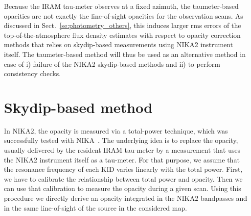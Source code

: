 %
%


Because the IRAM tau-meter observes at a fixed azimuth, the
taumeter-based opacities are not exactly the line-of-sight opacities for
the observation scans. As discussed in
Sect.~\ref{se:photometry_others}, this induces larger rms errors of
the top-of-the-atmosphere flux density estimates with respect to
opacity correction methods that relies on skydip-based measurements using
NIKA2 instrument itself. The taumeter-based method will thus be used
as an alternative method in case of i) failure of the NIKA2 skydip-based
methods and ii) to perform consistency checks.




\section{Skydip-based method}%
\label{se:skydip-method}

In NIKA2, the opacity is measured via a total-power technique, which was
successfully tested with NIKA~\cite{Catalano:2014nml}.  The
underlying idea is to replace the opacity, usually delivered by the resident
IRAM tau-meter by a measurement that uses the NIKA2 instrument itself
as a tau-meter. For that purpose, we assume that the resonance
frequency of each KID varies linearly with the total power. First, we have to
calibrate the relationship between total power and opacity. Then we can use
that calibration to measure the opacity during a given scan.
Using this procedure we directly derive an opacity
integrated in the NIKA2 bandpasses and in the same line-of-sight of the
source in the considered map.

